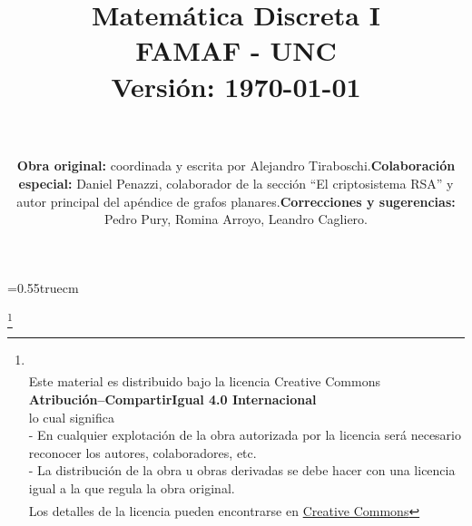 \documentclass[11pt,spanish,makeidx]{amsbook}
\theoremstyle{definition}
\theoremstyle{remark}
\begin{document}
	\baselineskip=0.55truecm %


	\title{Matemática Discreta I \\ FAMAF  - UNC \\ Versión: \today
	 }

	\maketitle

	\newpage

	\author{
		${}^{}$
		\\${}^{}$
		\\${}^{}$
		 \\${}^{}$\\ 
		\flushleft 
		\begin{itemize}
			\item \textbf{Obra original:} coordinada y escrita por Alejandro Tiraboschi. 
			\item \textbf{Colaboración especial: } Daniel Penazzi, colaborador  de la sección ``El criptosistema RSA'' y autor principal del apéndice de grafos planares.  
			\item \textbf{Correcciones y sugerencias:} Pedro Pury, Romina Arroyo, Leandro Cagliero. 
		\end{itemize}
	}



	\vskip 2cm 
	\thanks{
		 \\
		${}^{}$\\
		{\flushleft 
			Este material es distribuido bajo la licencia Creative Commons} \\
		{\center \textbf{Atribución--CompartirIgual 4.0 Internacional}}
		\\ 
		\center  lo cual significa 
		\\
		\flushleft
		- En cualquier explotación de la obra autorizada por la licencia será necesario reconocer los autores, colaboradores, etc.\\
		- La distribución de la obra u obras derivadas se debe hacer con una licencia igual a la que regula la obra original.\\
		${}^{}$
		\\
		Los detalles de la licencia pueden encontrarse en \href{https://creativecommons.org/licenses/by/4.0/deed.es}{Creative Commons}
	}
\end{document}
